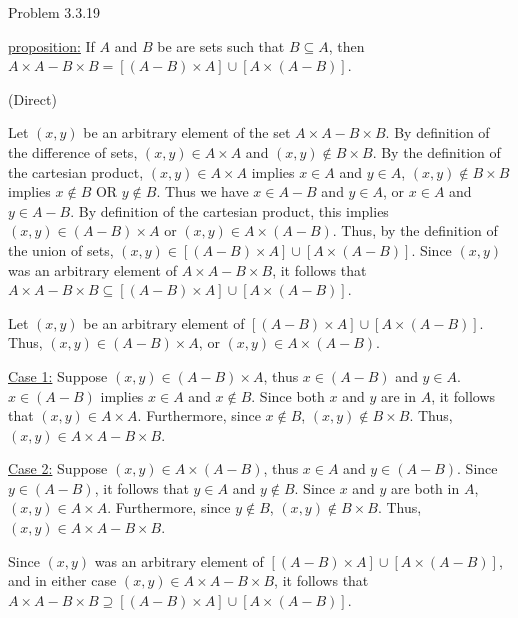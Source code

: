\documentclass{article}
\theoremstyle{definition}
\begin{document}



	\noindent Problem 3.3.19  \vspace{0.3cm}

	\underline{proposition:} If $A$ and $B$ be are sets such that
	$B\subseteq A$, then $A\times A-B\times B=[(A-B)\times A]\cup
	[A\times (A-B)]$.

	\vspace{.3cm}

	 (Direct)

	\vspace{.2cm}

	Let $(x,y)$ be an arbitrary element of the set $A\times A-B\times
	B$. By definition of the difference of sets, $(x,y)\in A\times A$
	and $(x,y)\not\in B\times B$. By the definition of the cartesian
	product, $(x,y)\in A\times A$ implies $x\in A$ and $y\in A$,
	$(x,y)\not\in B\times B$ implies $x\not\in B$ OR $y\not\in B$. Thus
	we have $x \in A-B$ and $y \in A$, or $x \in A$ and $y\in A-B$. By
	definition of the cartesian product, this implies $(x,y)\in
	(A-B)\times A$ or $(x,y)\in A\times (A-B)$. Thus, by the definition
	of the union of sets, $(x,y)\in [(A-B)\times A]\cup [A\times
	(A-B)]$. Since $(x,y)$ was an arbitrary element of $A\times
	A-B\times B$, it follows that $A\times A-B\times
	B\subseteq[(A-B)\times A]\cup [A\times (A-B)]$.

	\vspace{.2cm}

	Let $(x,y)$ be an arbitrary element of $[(A-B)\times A]\cup [A\times
	(A-B)]$. Thus, $(x,y)\in (A-B)\times A$, or $(x,y)\in A\times
	(A-B)$.

	\underline{Case 1:}  Suppose $(x,y)\in (A-B)\times A$, thus $x\in
	(A-B)$ and $y\in A$.  $x\in (A-B)$ implies $x\in A$ and $x\not\in
	B$. Since both $x$ and $y$ are in $A$, it follows that $(x,y)\in
	A\times A$. Furthermore, since $x\not\in B$, $(x,y)\not\in B\times
	B$. Thus, $(x,y)\in A\times A-B\times B$.

	\underline{Case 2:}  Suppose $(x,y)\in A\times(A-B)$, thus $x\in A$
	and $y\in (A-B)$. Since $y\in (A-B)$, it follows that $y\in A$ and
	$y\not\in B$. Since $x$ and $y$ are both in $A$, $(x,y)\in A\times
	A$. Furthermore, since $y\not\in B$, $(x,y)\not\in B\times B$.
	Thus, $(x,y)\in A\times A-B\times B$.

	Since $(x,y)$ was an arbitrary element of $[(A-B)\times A]\cup
	[A\times (A-B)]$, and in either case $(x,y)\in A\times A-B\times B$,
	it follows that $A\times A-B\times B\supseteq[(A-B)\times A]\cup
	[A\times (A-B)]$.
\end{document}
